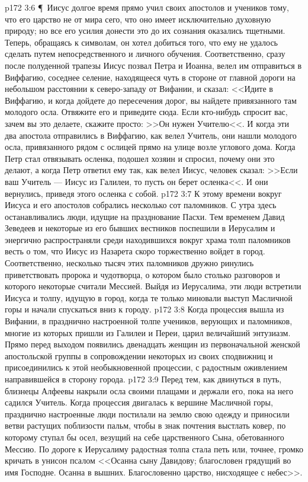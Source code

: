 \vs p172 3:6 \P\ Иисус долгое время прямо учил своих апостолов и учеников тому, что его царство не от мира сего, что оно имеет исключительно духовную природу; но все его усилия донести это до их сознания оказались тщетными. Теперь, обращаясь к символам, он хотел добиться того, что ему не удалось сделать путем непосредственного и личного обучения. Соответственно, сразу после полуденной трапезы Иисус позвал Петра и Иоанна, велел им отправиться в Виффагию, соседнее селение, находящееся чуть в стороне от главной дороги на небольшом расстоянии к северо\hyp{}западу от Вифании, и сказал: <<Идите в Виффагию, и когда дойдете до пересечения дорог, вы найдете привязанного там молодого осла. Отвяжите его и приведите сюда. Если кто\hyp{}нибудь спросит вас, зачем вы это делаете, скажите просто: >>Он нужен Учителю<<. И когда эти два апостола отправились в Виффагию, как велел Учитель, они нашли молодого осла, привязанного рядом с ослицей прямо на улице возле углового дома. Когда Петр стал отвязывать осленка, подошел хозяин и спросил, почему они это делают, а когда Петр ответил ему так, как велел Иисус, человек сказал: >>Если ваш Учитель --- Иисус из Галилеи, то пусть он берет осленка<<. И они вернулись, приведя этого осленка с собой.
\vs p172 3:7 К этому времени вокруг Иисуса и его апостолов собрались несколько сот паломников. С утра здесь останавливались люди, идущие на празднование Пасхи. Тем временем Давид Зеведеев и некоторые из его бывших вестников поспешили в Иерусалим и энергично распространяли среди находившихся вокруг храма толп паломников весть о том, что Иисус из Назарета скоро торжественно войдет в город. Соответственно, несколько тысяч этих паломников дружно ринулись приветствовать пророка и чудотворца, о котором было столько разговоров и которого некоторые считали Мессией. Выйдя из Иерусалима, эти люди встретили Иисуса и толпу, идущую в город, когда те только миновали выступ Масличной горы и начали спускаться вниз к городу.
\vs p172 3:8 Когда процессия вышла из Вифании, в празднично настроенной толпе учеников, верующих и паломников, многие из которых пришли из Галилеи и Переи, царил величайший энтузиазм. Прямо перед выходом появились двенадцать женщин из первоначальной женской апостольской группы в сопровождении некоторых из своих сподвижниц и присоединились к этой необыкновенной процессии, с радостным оживлением направившейся в сторону города.
\vs p172 3:9 Перед тем, как двинуться в путь, близнецы Алфеевы накрыли осла своими плащами и держали его, пока на него садился Учитель. Когда процессия двигалась к вершине Масличной горы, празднично настроенные люди постилали на землю свою одежду и приносили ветви растущих поблизости пальм, чтобы в знак почтения выстлать ковер, по которому ступал бы осел, везущий на себе царственного Сына, обетованного Мессию. По дороге к Иерусалиму радостная толпа стала петь или, точнее, громко кричать в унисон псалом <<Осанна сыну Давидову; благословен грядущий во имя Господне. Осанна в вышних. Благословенно царство, нисходящее с небес>>.
